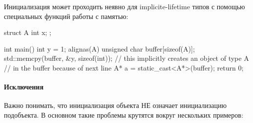 \documentclass{article}
\begin{document}
Инициализация может проходить неявно для implicite-lifetime типов с помощью специальных функций работы с памятью:
\begin{cppcode}[numbers = none]
struct A {
  int x;
};

int main() {
  int y = 1;
  alignas(A) unsigned char buffer[sizeof(A)];
  std::memcpy(buffer, &y, sizeof(int)); // this implicitly creates an object of type A
                                        // in the buffer because of next line
  A* a = static_cast<A*>(buffer);
  return 0;
}
\end{cppcode}

\paragraph{Исключения}

Важно понимать, что инициализация объекта НЕ означает инициализацию подобъекта.
В основном такие проблемы крутятся вокруг нескольких примеров:
\end{document}
